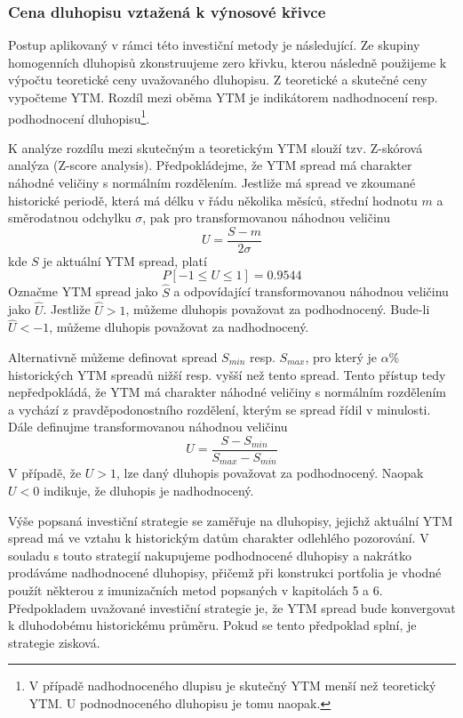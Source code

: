 \documentclass[a4paper]{book}
\begin{document}
\subsubsection{Cena dluhopisu vztažená k výnosové křivce}

Postup aplikovaný v rámci této investiční metody je následující. Ze skupiny homogenních dluhopisů zkonstruujeme zero křivku, kterou následně použijeme k výpočtu teoretické ceny uvažovaného dluhopisu. Z teoretické a skutečné ceny vypočteme YTM. Rozdíl mezi oběma YTM je indikátorem nadhodnocení resp. podhodnocení dluhopisu\footnote{V případě nadhodnoceného dlupisu je skutečný YTM menší než teoretický YTM. U podnodnoceného dluhopisu je tomu naopak.}.

K analýze rozdílu mezi skutečným a teoretickým YTM slouží tzv. Z-skórová analýza (Z-score analysis). Předpokládejme, že YTM spread má charakter náhodné veličiny s normálním rozdělením. Jestliže má spread ve zkoumané historické periodě, která má délku v řádu několika měsíců, střední hodnotu $m$ a směrodatnou odchylku $\sigma$, pak pro transformovanou náhodnou veličinu
\begin{equation*}
U = \frac{S - m}{2\sigma}
\end{equation*}
kde $S$ je aktuální YTM spread, platí
\begin{equation*}
P[-1 \le U \le 1] = 0.9544
\end{equation*}
Označme YTM spread jako $\hat{S}$ a odpovídající transformovanou náhodnou veličinu jako $\hat{U}$. Jestliže $\hat{U} > 1$, můžeme dluhopis považovat za podhodnocený. Bude-li $\hat{U} < - 1$, můžeme dluhopis považovat za nadhodnocený. 

Alternativně můžeme definovat spread $S_{min}$ resp. $S_{max}$, pro který je $\alpha$\% historických YTM spreadů nižší resp. vyšší než tento spread. Tento přístup tedy nepředpokládá, že YTM má charakter náhodné veličiny s normálním rozdělením a vychází z pravděpodonostního rozdělení, kterým se spread řídil v minulosti. Dále definujme transformovanou náhodnou veličinu
\begin{equation*}
U = \frac{S - S_{min}}{S_{max} - S_{min}}
\end{equation*}
V případě, že $U > 1$, lze daný dluhopis považovat za podhodnocený. Naopak $U < 0$ indikuje, že dluhopis je nadhodnocený.

Výše popsaná investiční strategie se zaměřuje na dluhopisy, jejichž aktuální YTM spread má ve vztahu k historickým datům charakter odlehlého pozorování. V souladu s touto strategií nakupujeme podhodnocené dluhopisy a nakrátko prodáváme nadhodnocené dluhopisy, přičemž při konstrukci portfolia je vhodné použít některou z imunizačních metod popsaných v kapitolách 5 a 6. Předpokladem uvažované investiční strategie je, že YTM spread bude konvergovat k dluhodobému historickému průměru. Pokud se tento předpoklad splní, je strategie zisková.
\end{document}

